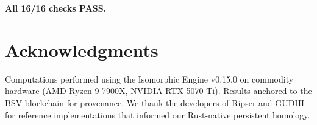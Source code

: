 \documentclass[12pt,a4paper]{article}
\theoremstyle{definition}\newtheorem{definition}[theorem]{Definition}
\theoremstyle{remark}\newtheorem{remark}[theorem]{Remark}
\begin{document}
\noindent\textbf{All 16/16 checks PASS.}

\section*{Acknowledgments}

Computations performed using the Isomorphic Engine v0.15.0 on commodity
hardware (AMD Ryzen 9 7900X, NVIDIA RTX 5070 Ti). Results anchored to the
BSV blockchain for provenance. We thank the developers of Ripser
\cite{bauer2021ripser} and GUDHI \cite{maria2014gudhi} for reference
implementations that informed our Rust-native persistent homology.

\end{document}

